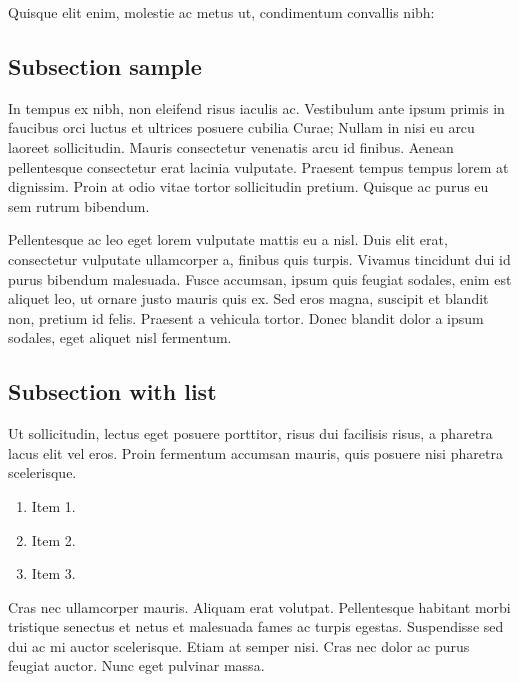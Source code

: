 Quisque elit enim, molestie ac metus ut, condimentum convallis nibh:

\subsection{Subsection sample}

In tempus ex nibh, non eleifend risus iaculis ac. Vestibulum ante ipsum primis in faucibus orci luctus et ultrices posuere cubilia Curae; Nullam in nisi eu arcu laoreet sollicitudin. Mauris consectetur venenatis arcu id finibus. Aenean pellentesque consectetur erat lacinia vulputate. Praesent tempus tempus lorem at dignissim. Proin at odio vitae tortor sollicitudin pretium. Quisque ac purus eu sem rutrum bibendum.

%

Pellentesque ac leo eget lorem vulputate mattis eu a nisl. Duis elit erat, consectetur vulputate ullamcorper a, finibus quis turpis. Vivamus tincidunt dui id purus bibendum malesuada. Fusce accumsan, ipsum quis feugiat sodales, enim est aliquet leo, ut ornare justo mauris quis ex. Sed eros magna, suscipit et blandit non, pretium id felis. Praesent a vehicula tortor. Donec blandit dolor a ipsum sodales, eget aliquet nisl fermentum.

\subsection{Subsection with list}

Ut sollicitudin, lectus eget posuere porttitor, risus dui facilisis risus, a pharetra lacus elit vel eros. Proin fermentum accumsan mauris, quis posuere nisi pharetra scelerisque. 
\begin{enumerate}
  \item Item 1.
  \item Item 2.
  \item Item 3.
\end{enumerate}

Cras nec ullamcorper mauris. Aliquam erat volutpat. Pellentesque habitant morbi tristique senectus et netus et malesuada fames ac turpis egestas. Suspendisse sed dui ac mi auctor scelerisque. Etiam at semper nisi. Cras nec dolor ac purus feugiat auctor. Nunc eget pulvinar massa.

